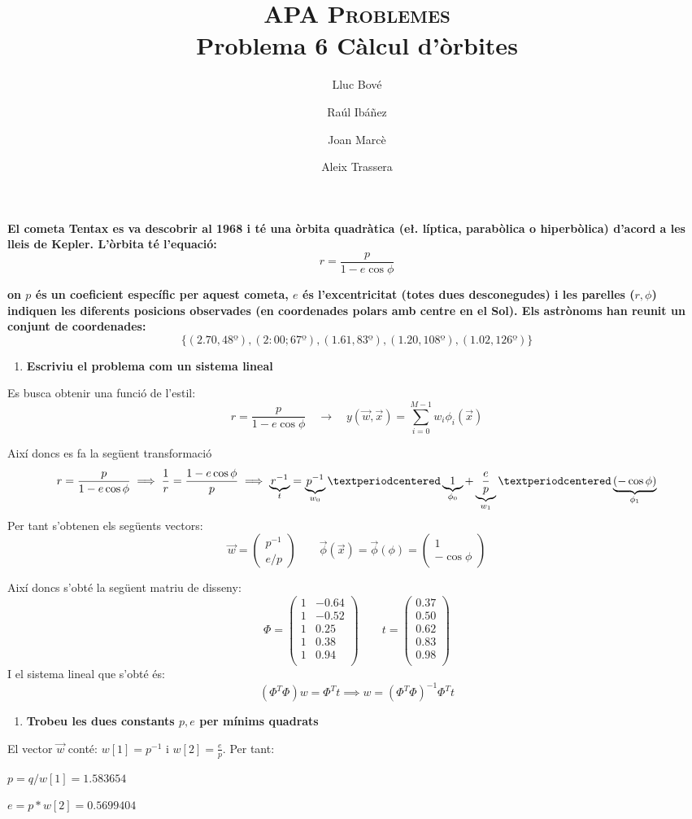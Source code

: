 \documentclass[a4paper]{article}
\title{\textsc{APA Problemes} \\ Problema 6 Càlcul d'òrbites}
\author{Lluc Bové \and Raúl Ibáñez \and Joan Marcè \and Aleix Trassera}
\date{}
\begin{document}
\maketitle

\textbf{El cometa Tentax es va descobrir al 1968 i té una òrbita quadràtica (e\l. líptica, parabòlica o hiperbòlica) d'acord a les lleis de Kepler. L'òrbita té l'equació:}
$$
r = \frac{p}{1 - e \cos \phi}
$$

\textbf{on $p$ és un coeficient específic per aquest cometa, $e$ és l'excentricitat (totes dues desconegudes) i les parelles ($r,\phi$) indiquen les diferents posicions observades (en coordenades polars amb centre en el Sol). Els astrònoms han reunit un conjunt de coordenades:}
$$
\{(2.70, 48º), (2:00; 67º), (1.61, 83º), (1.20, 108º), (1.02, 126º)\}
$$

\begin{enumerate}
	\item \textbf{Escriviu el problema com un sistema lineal}
\end{enumerate}

Es busca obtenir una funció de l'estil:
$$
r = \frac{p}{1 - e \cos\phi} \quad \longrightarrow \quad y(\vec{w}, \vec{x}) = \sum_{i=0}^{M - 1} w_i \phi_i(\vec{x})
$$

Així doncs es fa la següent transformació
$$
r = \frac{p}{1 - e \cos \phi} \implies \frac{1}{r} = \frac{1 - e \cos \phi}{p} 
\implies \underbrace{r^{-1}}_{t} = 
\underbrace{p^{-1}}_{w_0}·
\underbrace{1}_{\mathclap{\phi_0}} +
\underbrace{\frac{e}{p}}_{w_1}·\underbrace{(-\cos\phi)}_{\phi_1}
$$
Per tant s'obtenen els següents vectors:
$$
\vec{w} = 
\begin{pmatrix}
p^{-1}\\
e/p
\end{pmatrix}
\qquad
\vec{\phi}(\vec{x}) = \vec{\phi}(\phi) =
\begin{pmatrix}
1\\
- \cos \phi 
\end{pmatrix}
$$

Així doncs s'obté la següent matriu de disseny:
$$
\Phi = 
\begin{pmatrix}
1 & -0.64 \\
1 & -0.52 \\
1 & 0.25 \\
1 & 0.38 \\
1 & 0.94 \\
\end{pmatrix}
\qquad
t =
\begin{pmatrix}
0.37 \\
0.50 \\
0.62 \\
0.83 \\
0.98 \\
\end{pmatrix}
$$
I el sistema lineal que s'obté és:
$$
(\Phi^T\Phi)w = \Phi^T t \implies w = (\Phi^T\Phi)^{-1} \Phi^T t 
$$
\begin{enumerate}[resume]
	\item \textbf{Trobeu les dues constants $p,e$ per mínims quadrats}
\end{enumerate}

El vector $\vec{w}$ conté: $w[1] = p^{-1}$ i $ w[2] = \frac{e}{p}$. Per tant:

$ p = q / w[1] = 1.583654 $

$ e = p * w[2] = 0.5699404 $
\end{document}
